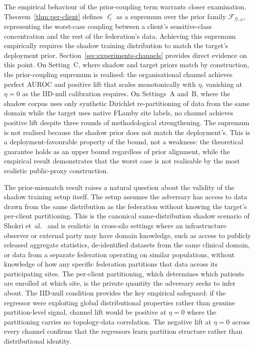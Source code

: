 \documentclass[letterpaper,journal]{IEEEtran}
\begin{document}
The empirical behaviour of the prior-coupling term warrants closer
examination. Theorem~\ref{thm:per-client} defines $\ell_i^\circ$ as
a supremum over the prior family $\mathcal{F}_{\mathcal{G},\omega}$,
representing the worst-case coupling between a client's
sensitive-class concentration and the rest of the federation's data.
Achieving this supremum empirically requires the shadow training
distribution to match the target's deployment prior.
Section~\ref{sec:experiments-channels} provides direct evidence on
this point. On Setting~C, where shadow and target priors match by
construction, the prior-coupling supremum is realised: the
organisational channel achieves perfect AUROC and positive lift that
scales monotonically with $\eta$, vanishing at $\eta = 0$ as the
IID-null calibration requires. On Settings~A and~B, where the
shadow corpus uses only synthetic Dirichlet re-partitioning of data
from the same domain while the target uses native FLamby site
labels, no channel achieves positive lift despite three rounds of
methodological strengthening. The supremum is not realised because
the shadow prior does not match the deployment's. This is a
deployment-favourable property of the bound, not a weakness: the
theoretical guarantee holds as an upper bound regardless of prior
alignment, while the empirical result demonstrates that the worst
case is not realisable by the most realistic public-proxy
construction.

The prior-mismatch result raises a natural question about the
validity of the shadow training setup itself. The setup assumes the
adversary has access to data drawn from the same distribution as the
federation without knowing the target's per-client partitioning.
This is the canonical same-distribution shadow scenario of Shokri
et~al.~\cite{shokri2017membership} and is realistic in cross-silo
settings where an infrastructure observer or external party may have
domain knowledge, such as access to publicly released aggregate
statistics, de-identified datasets from the same clinical domain, or
data from a separate federation operating on similar populations,
without knowledge of how any specific federation partitions that
data across its participating sites. The per-client partitioning,
which determines which patients are enrolled at which site, is the
private quantity the adversary seeks to infer about. The IID-null
condition provides the key empirical safeguard: if the regressor
were exploiting global distributional properties rather than genuine
partition-level signal, channel lift would be positive at $\eta = 0$
where the partitioning carries no topology-data correlation. The
negative lift at $\eta = 0$ across every channel confirms that the
regressors learn partition structure rather than distributional
identity.
\end{document}
